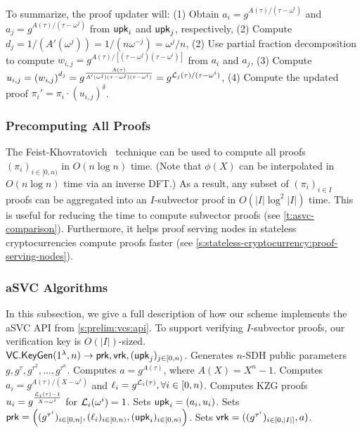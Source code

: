 To summarize, the proof updater will:
(1) Obtain $a_i = g^{A(\tau)/(\tau-\omega^i)}$ and $a_j = g^{A(\tau)/(\tau-\omega^j)}$ from $\mathsf{upk}_i$ and $\mathsf{upk}_j$, respectively,
(2) Compute $d_j=1/(A'(\omega^j))={1}/{(n\omega^{-j})}=\omega^j/n$,
(2) Use partial fraction decomposition to compute $w_{i,j}=g^{A(\tau)/[(\tau-\omega^j)(\tau-\omega^i)]}$ from $a_i$ and $a_j$,
(3) Compute $u_{i,j}=\left(w_{i,j}\right)^{d_j} = g^{\frac{A(\tau)}{A'(\omega^j)(\tau-\omega^j)(\tau-\omega^i)}}=g^{\mathcal{L}_j(\tau)/(\tau-\omega^i)}$,
(4) Compute the updated proof $\pi_i' = \pi_i \cdot (u_{i,j})^\delta$.

\subsubsection{Precomputing All Proofs}
\label{s:asvc:from-kzg:precomp}
The Feist-Khovratovich~\cite{FK20} technique can be used to compute all proofs $(\pi_i)_{i\in[0,n)}$ in $O(n\log{n})$ time.
(Note that $\phi(X)$ can be interpolated in $O(n\log{n})$ time via an inverse DFT.)
As a result, any subset of $(\pi_i)_{i\in I}$ proofs can be aggregated into an $I$-subvector proof in $O(\vert I \vert \log^2{|I|})$ time.
This is useful for reducing the time to compute subvector proofs (see \cref{t:asvc-comparison}).
Furthermore, it helps proof serving nodes in stateless cryptocurrencies compute proofs faster (see \cref{s:stateless-cryptocurrency:proof-serving-nodes}).


\subsubsection{aSVC Algorithms}
\label{s:asvc:from-kzg:algorithms}
In this subsection, we give a full description of how our scheme implements the aSVC API from \cref{s:prelim:vcs:api}.
To support verifying $I$-subvector proofs, our verification key is $O(|I|)$-sized.
\\

\api $\mathsf{VC}.\mathsf{KeyGen}(1^\lambda, n) \rightarrow \mathsf{prk},\mathsf{vrk},(\mathsf{upk}_j)_{j\in[0,n)}$.
Generates $n$-SDH public parameters $g,g^\tau,g^{\tau^2},\dots,g^{\tau^n}$.
Computes $a=g^{A(\tau)}$, where $A(X)=X^n - 1$.
Computes $a_i=g^{A(\tau)/(X-\omega^i)}$ and $\ell_i = g^{\mathcal{L}_i(\tau)}, \forall i\in[0,n)$.
Computes KZG proofs $u_i=g^{\frac{\mathcal{L}_i(\tau)-1}{X-\omega^i}}$ for $\mathcal{L}_i(\omega^i) = 1$.
Sets $\mathsf{upk}_i = (a_i, u_i)$.
Sets $\mathsf{prk} = \left((g^{\tau^i})_{i\in[0,n]},(\ell_i)_{i\in[0,n)}, (\mathsf{upk}_i)_{i\in[0,n)}\right)$.
Sets $\mathsf{vrk} = ((g^{\tau^i})_{i\in [0,|I|]},a)$.


